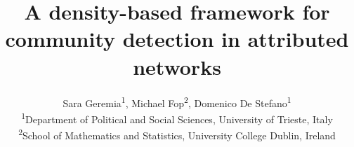 \documentclass[11pt]{article}
\begin{document}
%
\title{A density-based framework for community detection in attributed networks}

\author{Sara Geremia\textsuperscript{1}, Michael Fop\textsuperscript{2}, Domenico De Stefano\textsuperscript{1} \\[1ex]
\small \textsuperscript{1}Department of Political and Social Sciences, University of Trieste, Italy \\
\small \textsuperscript{2}School of Mathematics and Statistics, University College Dublin, Ireland
}
\date{}

\maketitle              %
\end{document}
